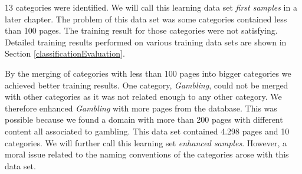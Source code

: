 13 categories were identified. We will call this learning data set \textit{first samples} in a later chapter. The problem of this data set was some categories contained less than 100 pages. The training result for those categories were not satisfying. Detailed training results performed on various training data sets are shown in Section \ref{classificationEvaluation}. 

By the merging of categories with less than 100 pages into bigger categories we achieved better training results. One category, \textit{Gambling}, could not be merged with other categories as it was not related enough to any other category. We therefore enhanced \textit{Gambling} with more pages from the database. This was possible because we found a domain with more than 200 pages with different content all associated to gambling. This data set contained 4.298 pages and 10 categories. We will further call this learning set \textit{enhanced samples}. However, a moral issue related to the naming conventions of the categories arose with this data set. 

